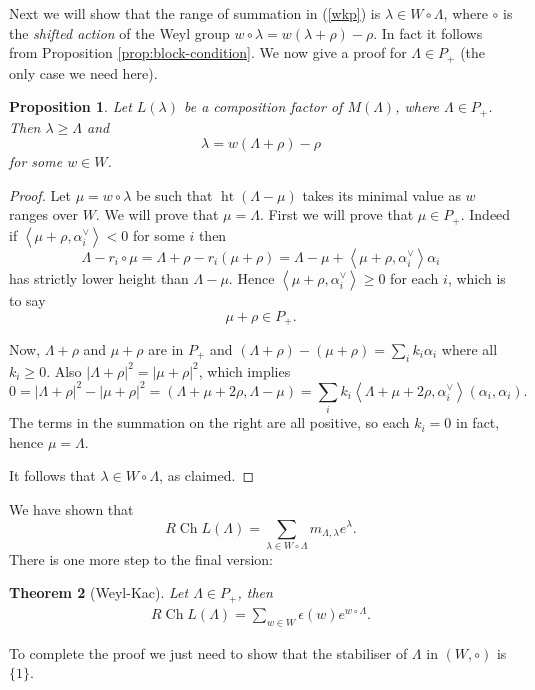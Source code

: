 \documentclass[12pt]{article}
\theoremstyle{plain}
\newtheorem{thm}{Theorem}[section]
\newtheorem{prop}[thm]{Proposition}
\theoremstyle{definition}
\numberwithin{equation}{section}
\DeclareMathOperator{\ch}{Ch}
\DeclareMathOperator{\height}{ht}
\newcommand{\al}{\alpha}
\newcommand{\la}{\lambda}
\newcommand{\La}{\Lambda}
\newcommand{\eps}{\epsilon}
\begin{document}
Next we will show that the range of summation in (\ref{wkp}) is $\la \in W \circ \La$, where $\circ$ is the \emph{shifted action} of the Weyl group $w \circ \la = w(\la+\rho)-\rho$. In fact it follows from Proposition \ref{prop:block-condition}. We now give a proof for $\La \in P_+$ (the only case we need here).
\begin{prop}\label{prop:dominant-block-condition}
Let $L(\la)$ be a composition factor of $M(\Lambda)$, where $\La \in P_+$. Then $\la \geq \La$ and
\[
\la = w(\La+\rho) - \rho
\]
for some $w \in W$.
\end{prop}


\begin{proof}
Let $\mu = w\circ \la$ be such that $\height(\La-\mu)$ takes its minimal value as $w$ ranges over $W$. We will prove that $\mu = \La$. First we will prove that $\mu \in P_+$. Indeed if $\left<\mu+\rho, \al^\vee_i\right> < 0$ for some $i$ then
\[
\La - r_i \circ \mu = \La+\rho - r_i(\mu+\rho) = \La-\mu + \left<\mu+\rho, \al^\vee_i\right> \al_i
\]
has strictly lower height than $\La-\mu$. Hence $\left<\mu+\rho, \al^\vee_i\right> \geq 0$ for each $i$, which is to say
\[
\mu+\rho \in P_+.
\]

Now, $\La+\rho$ and $\mu+\rho$ are in $P_+$ and $(\La+\rho) - (\mu+\rho) = \sum_i k_i \al_i$ where all $k_i \geq 0$. Also $|\La+\rho|^2 = |\mu+\rho|^2$, which implies
\[
0 = |\La+\rho|^2 - |\mu+\rho|^2 = (\La+\mu+2\rho, \La-\mu) = \sum_i k_i \left<\La+\mu+2\rho, \al^\vee_i\right> (\al_i, \al_i).
\]
The terms in the summation on the right are all positive, so each $k_i = 0$ in fact, hence $\mu = \La$.

It follows that $\la \in W \circ \La$, as claimed.
\end{proof}

We have shown that
\[
R \ch L(\La) = \sum_{\la \in W \circ \La} m_{\La, \la} e^{\la}.
\]
There is one more step to the final version:
\begin{thm}[Weyl-Kac]
Let $\La \in P_+$, then
\begin{align} \label{wk}
R \ch L(\La) = \sum_{w \in W} \eps(w) e^{w \circ \La}.
\end{align}
\end{thm}

To complete the proof we just need to show that the stabiliser of $\La$ in $(W, \circ)$ is $\{1\}$.%

\end{document}

